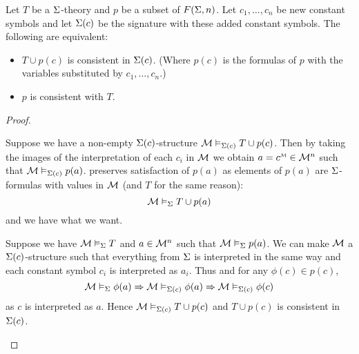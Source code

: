 \begin{lem}
    Let $T$ be a $\Sigma$-theory and $p$ be a subset of $F(\Sigma,n)$.
    Let $c_1,\dots,c_n$ be new constant symbols and let $\Sigma(c)$ be 
    the signature with these added constant symbols.
    The following are equivalent:
    \begin{itemize}
        \item $T \cup p(c)$ is consistent in $\Sigma(c)$.
            (Where $p(c)$ is the formulas of $p$ with the variables substituted 
            by $c_1,\dots,c_n$.)
        \item $p$ is consistent with $T$.
    \end{itemize}
\end{lem}
\begin{proof}
    \begin{forward}
        Suppose we have a non-empty $\Sigma(c)$-structure 
        $\mathcal{M} \vDash_{\Sigma(c)} T \cup p(c)$.
        Then by taking the images of the interpretation of each $c_i$ in $\mathcal{M}$
        we obtain $a = \modintp{\MM}{c} \in {\MM}^n$ such that 
        $\mathcal{M} \vDash_{\Sigma(c)} p(a)$.
         preserves 
        satisfaction of $p(a)$  as elements of $p(a)$ are $\Sigma$-formulas
        with values in $\mathcal{M}$ (and $T$ for the same reason):
        \[\mathcal{M} \vDash_{\Sigma} T \cup p(a)\]
        and we have what we want.
    \end{forward}

    \begin{backward}
        Suppose we have $\mathcal{M} \vDash_{\Sigma} T$ and $a \in {\mathcal{M}}^n$
        such that $\mathcal{M} \vDash_{\Sigma} p(a)$.
        We can make $\mathcal{M}$ a $\Sigma(c)$-structure such that 
        everything from $\Sigma$ is interpreted in the same way 
        and each constant symbol $c_i$ is interpreted as $a_i$.
        Thus  and for any 
        $\phi(c) \in p(c)$,
        \[\mathcal{M} \vDash_{\Sigma} \phi(a) \Rightarrow \mathcal{M} \vDash_{\Sigma(c)} \phi(a)
        \Rightarrow \mathcal{M} \vDash_{\Sigma(c)} \phi(c)\]
        as $c$ is interpreted as $a$.
        Hence $\mathcal{M} \vDash_{\Sigma(c)} T \cup p(c)$ 
        and $T \cup p(c)$ is consistent in $\Sigma(c)$.
    \end{backward}
\end{proof}

